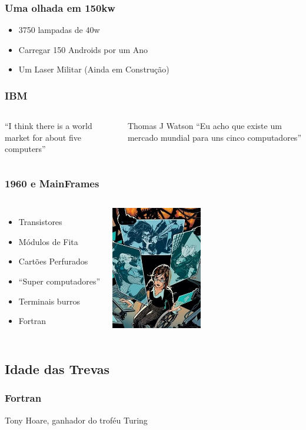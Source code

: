 \documentclass{beamer}
\begin{document}
\begin{frame} \frametitle{Uma olhada em 150kw}
    \begin{itemize}
    \item 3750 lampadas de 40w
    \item Carregar 150 Androids por um Ano
    \item Um Laser Militar (Ainda em Construção)
    \end{itemize}
\end{frame}

\begin{frame} \frametitle{IBM}
    \begin{columns}
        ``I think there is a world market for about five computers''

        Thomas J Watson
        \pause
        ``Eu acho que existe um mercado mundial para uns cinco computadores''
    \end{columns}
\end{frame}

\begin{frame} \frametitle{1960 e MainFrames}
    \begin{columns}
        \begin{itemize}
  \item Transistores
  \item Módulos de Fita
  \item Cartões Perfurados
  \item ``Super computadores''
  \item Terminais burros
  \item Fortran
        \end{itemize}
  \includegraphics[width=150px]{images/oraculo}
    \end{columns}
\end{frame}
\subsection { Idade das Trevas }
\begin{frame} \frametitle{Fortran}
 \linebreak
 \linebreak
 Tony Hoare, ganhador do troféu Turing
 \pause
 \linebreak
\end{frame}
\end{document}
